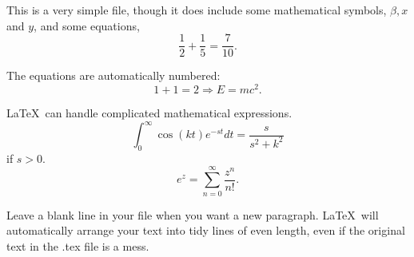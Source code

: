 \documentclass[12pt]{article}
\begin{document}
  This is a very simple file, though it does include some mathematical 
  symbols, $\beta, x$ and $y$,  and some equations,  
 \begin{equation} 
 \frac{1}{2} + \frac{1}{5} =  \frac{7}{10}. 
  \end{equation} 
 
 The equations are automatically numbered:
\begin{equation} 
 1 + 1 = 2 \Rightarrow E = m c^2.  
\end{equation}  

  \LaTeX\ can handle complicated mathematical expressions. 
 \begin{equation} 
 \int_0^\infty \cos (k t) e^{-s t} d t = \frac{s}{s^2 + k^2}
 \end{equation} 
 if $s > 0$. 
 \begin{equation}
 e^z = \sum_{n=0}^\infty \frac{ z^n}{n!} . 
 \end{equation} 

 Leave a blank line in your file when you want a new paragraph. 
      \LaTeX\ will automatically 
 arrange your text
              into tidy lines of 
 even length, even 
 if the 
 original text in the .tex file is a mess. 
 
 
\end{document}
